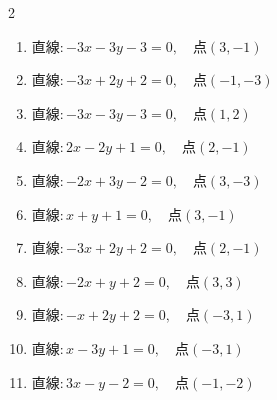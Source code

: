 \begin{multicols}{2}
\begin{enumerate}
  \item $直線:-3x-3y-3=0,\quad 点 ( 3, -1 )$


\columnbreak %

  \item $直線:-3x+2y+2=0,\quad 点 ( -1, -3 )$


  \item $直線:-3x-3y-3=0,\quad 点 ( 1, 2 )$


  \item $直線:2x-2y+1=0,\quad 点 ( 2, -1 )$


  \item $直線:-2x+3y-2=0,\quad 点 ( 3, -3 )$


  \item $直線:x+y+1=0,\quad 点 ( 3, -1 )$


  \item $直線:-3x+2y+2=0,\quad 点 ( 2, -1 )$


  \item $直線:-2x+y+2=0,\quad 点 ( 3, 3 )$


  \item $直線:-x+2y+2=0,\quad 点 ( -3, 1 )$


  \item $直線:x-3y+1=0,\quad 点 ( -3, 1 )$


  \item $直線:3x-y-2=0,\quad 点 ( -1, -2 )$


\columnbreak %


\end{enumerate}
\end{multicols}
